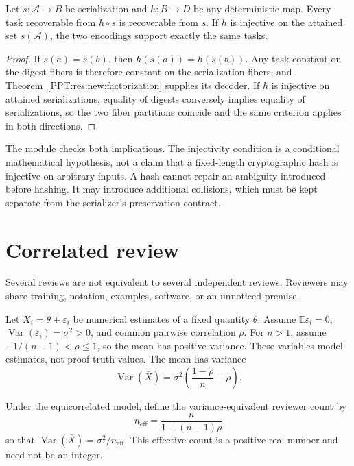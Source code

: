 \begin{PPTproposition}
\label{PPT:res:new:hash}
Let $s:\mathscr A\to B$ be serialization and $h:B\to D$ be any deterministic map. Every task recoverable from $h\circ s$ is recoverable from $s$. If $h$ is injective on the attained set $s(\mathscr A)$, the two encodings support exactly the same tasks.
\end{PPTproposition}
\begin{proof}
If $s(a)=s(b)$, then $h(s(a))=h(s(b))$. Any task constant on the digest fibers is therefore constant on the serialization fibers, and Theorem~\ref{PPT:res:new:factorization} supplies its decoder. If $h$ is injective on attained serializations, equality of digests conversely implies equality of serializations, so the two fiber partitions coincide and the same criterion applies in both directions.
\end{proof}

The module  checks both implications. The injectivity condition is a conditional mathematical hypothesis, not a claim that a fixed-length cryptographic hash is injective on arbitrary inputs. A hash cannot repair an ambiguity introduced before hashing. It may introduce additional collisions, which must be kept separate from the serializer's preservation contract.

\section{Correlated review}
\label{PPT:sec:old17}
\label{PPT:sec:correlated-review}

Several reviews are not equivalent to several independent reviews. Reviewers may share training, notation, examples, software, or an unnoticed premise.

Let $X_i=\theta+\varepsilon_i$ be numerical estimates of a fixed quantity $\theta$. Assume $\mathbb E\varepsilon_i=0$, $\operatorname{Var}(\varepsilon_i)=\sigma^2>0$, and common pairwise correlation $\rho$. For $n>1$, assume $-1/(n-1)<\rho\leq1$, so the mean has positive variance. These variables model estimates, not proof truth values. The mean has variance
\[
\operatorname{Var}(\bar X)
=
\sigma^2\left(\frac{1-\rho}{n}+\rho\right).
\]

\begin{PPTtheorem}
\label{PPT:res:17:1}
\label{PPT:thm:review-count}
Under the equicorrelated model, define the variance-equivalent reviewer count by
\[
\boxed{
 n_{\mathrm{eff}}
 =
 \frac{n}{1+(n-1)\rho}
}
\]
so that $\operatorname{Var}(\bar X)=\sigma^2/n_{\mathrm{eff}}$. This effective count is a positive real number and need not be an integer.
\end{PPTtheorem}

